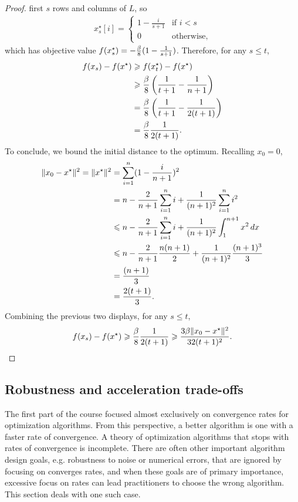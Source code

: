 \begin{proof}
first $s$ rows and columns of $L$, so
\begin{align*}
    x_s^\star[i] = 
    \begin{cases}
        1- \frac{i}{s + 1} &\text{if } i < s \\
        0 &\text{otherwise},
    \end{cases}
\end{align*}
which has objective value $f(x_s^\star) = -\frac{\beta}{8}(1 - \frac{1}{s + 1} )$.
Therefore, for any $s \leq t$,
\begin{align*}
    f(x_s) - f(x^\star) 
    &\geqslant f(x_t^\star) - f(x^\star) \\
    &\geqslant \frac{\beta}{8} \left(\frac{1}{t+1} - \frac{1}{n+1} \right ) \\
    &= \frac{\beta}{8} \left(\frac{1}{t+1} - \frac{1}{2(t+1)} \right ) \\
    &= \frac{\beta}{8}\frac{1}{2(t+1)}.
\end{align*}
To conclude, we bound the initial distance to the optimum. Recalling $x_0 = 0$,
\begin{align*}
    \lVert x_0 - x^\star\rVert^2 =
    \lVert x^\star\rVert^2 
    &= \sum_{i=1}^n (1 - \frac{i}{n+1} )^2  \\
    &= n - \frac{2}{n+1} \sum_{i=1}^n i + \frac{1}{(n+1)^2} \sum_{i=1}^{n} i^2 \\
    &\leqslant n - \frac{2}{n+1} \sum_{i=1}^n i + \frac{1}{(n+1)^2} \int_1^{n+1} x^2 \, dx \\
    &\leqslant n - \frac{2}{n+1}\frac{n(n+1)}{2} + \frac{1}{(n+1)^2} \frac{(n+1)^3}{3} \\
    &= \frac{(n+1)}{3} \\
    &= \frac{2(t+1)}{3}.
\end{align*}
Combining the previous two displays, for any $s \leq t$,
\begin{align*}
    f(x_s) - f(x^\star)
    \geqslant \frac{\beta}{8}\frac{1}{2(t+1)} 
    \geqslant \frac{3 \beta\lVert x_0 - x^\star\rVert^2}{32(t+1)^2}.
\end{align*}
\end{proof}

\subsection{Robustness and acceleration trade-offs}
The first part of the course focused almost exclusively on
convergence rates for optimization algorithms. From this
perspective, a better algorithm is one with a faster rate of convergence.
A theory of optimization algorithms that stops with rates of
convergence is incomplete. There are often other important algorithm design
goals, e.g. robustness to noise or numerical errors, that are ignored by
focusing on converges rates, and when these goals are of primary importance, 
excessive focus on rates can lead practitioners to choose the wrong algorithm.
This section deals with one such case.

